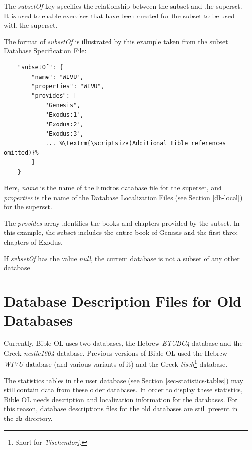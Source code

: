 \documentclass[11pt,oneside,a4paper]{memoir}
\begin{document}
The \emph{subsetOf} key specifies the relationship between the subset and the superset. It is used
to enable exercises that have been created for the subset to be used with the superset.

The format of \emph{subsetOf} is illustrated by this example taken from the subset Database
Specification File:

\begin{lstlisting}
    "subsetOf": {
        "name": "WIVU",
        "properties": "WIVU",
        "provides": [
            "Genesis",
            "Exodus:1",
            "Exodus:2",
            "Exodus:3",
            ... %\textrm{\scriptsize(Additional Bible references omitted)}%
        ]
    }
\end{lstlisting}

Here, \emph{name} is the name of the Emdros database file for the superset, and \emph{properties} is
the name of the Database Localization Files (see Section \ref{db-local}) for the superset.

The \emph{provides} array identifies the books and chapters provided by the subset. In this example,
the subset includes the entire book of Genesis and the first three chapters of Exodus.

If \emph{subsetOf} has the value \emph{null}, the current database is not a subset of any other
database.

\section{Database Description Files for Old Databases}\label{sec-old-db}

Currently, Bible OL uses two databases, the Hebrew \emph{ETCBC4} database and the Greek
\emph{nestle1904} database. Previous versions of Bible OL used the Hebrew \emph{WIVU} database (and
various variants of it) and the Greek \emph{tisch}\footnote{Short for \emph{Tischendorf.}} database.

The statistics tables in the user database (see Section \ref{sec-statistics-tables}) may
still contain data from these older databases. In order to display these statistics, Bible OL needs
description and localization information for the databases. For this reason, database descriptions
files for the old databases are still present in the \texttt{db} directory.



\end{document}
